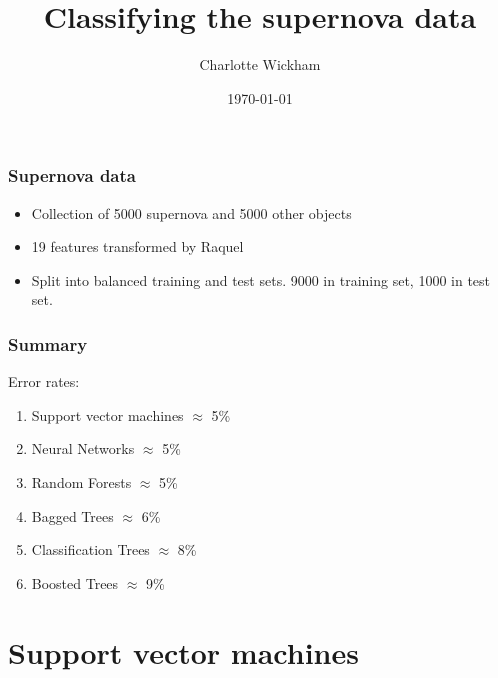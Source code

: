 \documentclass{beamer}
\title{Classifying the supernova data}
\author{Charlotte Wickham}
\date{\today}
\begin{document}
\frame{\titlepage}

\section[Outline]{ 	}
\frame{\tableofcontents}



\begin{frame}
	\frametitle{Supernova data}
	\begin{itemize}
		\item Collection of 5000 supernova and 5000 other objects
		\item 19 features transformed by Raquel
		\item Split into balanced training and test sets.  9000 in training set, 1000 in test set.
	\end{itemize}
\end{frame}

\begin{frame}
	\frametitle{Summary}
	Error rates:
\begin{enumerate}

	\item 	Support vector machines $\approx$ 5\%

	\item 	Neural Networks $\approx$ 5\%

	\item 	Random Forests $\approx$ 5\%

	\item 	Bagged Trees $\approx$ 6\%

	\item 	Classification Trees $\approx$ 8\%

	\item 	Boosted Trees $\approx$ 9\%

\end{enumerate}

\end{frame}


\section{Support vector machines}
\end{document}
